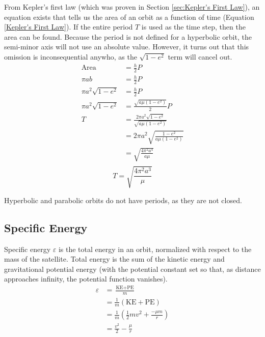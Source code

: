 \documentclass[../main.tex]{subfiles}
\begin{document}
From Kepler's first law (which was proven in Section \ref{sec:Kepler's First Law}), an equation exists that tells us the area of an orbit as a function of time (Equation \eqref{Kepler's First Law}). If the entire period $T$ is used as the time step, then the area can be found. Because the period is not defined for a hyperbolic orbit, the semi-minor axis will not use an absolute value. However, it turns out that this omission is inconsequential anywho, as the $\sqrt{1-e^2}$ term will cancel out.
\begin{align*}
    \text{Area}          & = \frac{h}{2}P                                     \\
    \pi{}ab              & = \frac{h}{2}P                                     \\
    \pi{}a^2\sqrt{1-e^2} & = \frac{h}{2}P                                     \\
    \pi{}a^2\sqrt{1-e^2} & = \frac{\sqrt{a\mu(1-e^2)}}{2}P                    \\
    T                    & = \frac{2\pi{}a^2\sqrt{1-e^2}}{\sqrt{a\mu(1-e^2)}} \\
                         & = 2\pi{}a^2\sqrt{\frac{1-e^2}{a\mu(1-e^2)}}        \\
                         & = \sqrt{\frac{4\pi^2a^4}{a\mu}}                    \\
\end{align*}
\begin{equation}\label{Period Geometric}
    T = \sqrt{\frac{4\pi^2a^3}{\mu}}
\end{equation}

Hyperbolic and parabolic orbits do not have periods, as they are not closed.

\bigskip\bigskip
\subsection{Specific Energy}\label{sec:Specific Energy}

Specific energy $\varepsilon$ is the total energy in an orbit, normalized with respect to the mass of the satellite. Total energy is the sum of the kinetic energy and gravitational potential energy (with the potential constant set so that, as distance approaches infinity, the potential function vanishes).
\begin{align*}
    \varepsilon & =\frac{\text{KE}+\text{PE}}{m}                             \\
                & =\frac{1}{m}(\text{KE}+\text{PE})                          \\
                & =\frac{1}{m}\left(\frac{1}{2}mv^2+\frac{-\mu{}m}{r}\right) \\
                & =\frac{v^2}{2}-\frac{\mu{}}{r}                             \\
\end{align*}
\end{document}
